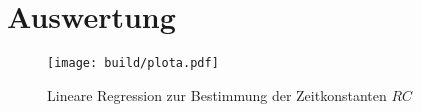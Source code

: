 \section{Auswertung}
\label{sec:Auswertung}

\begin{figure}
  \centering
  \texttt{[image: build/plota.pdf]}
  \caption{Lineare Regression zur Bestimmung der Zeitkonstanten $RC$}
  \label{fig:plota}
\end{figure}
